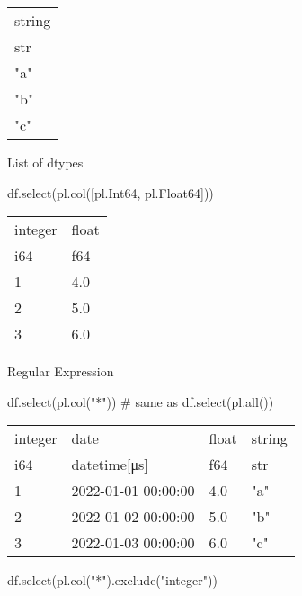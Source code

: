 \documentclass[
  letterpaper,
  DIV=11,
  numbers=noendperiod]{scrartcl}
\newenvironment{Shaded}{\begin{snugshade}}{\end{snugshade}}
\newcommand{\CommentTok}[1]{\textcolor[rgb]{0.37,0.37,0.37}{#1}}
\newcommand{\NormalTok}[1]{\textcolor[rgb]{0.00,0.23,0.31}{#1}}
\newcommand{\StringTok}[1]{\textcolor[rgb]{0.13,0.47,0.30}{#1}}
\begin{document}
\begin{longtable}[]{@{}l@{}}
\toprule()
string \\
str \\
\midrule()
\endhead
"a" \\
"b" \\
"c" \\
\bottomrule()
\end{longtable}

List of dtypes

\begin{Shaded}
\begin{Highlighting}[]
\NormalTok{df.select(pl.col([pl.Int64, pl.Float64]))}
\end{Highlighting}
\end{Shaded}

\begin{longtable}[]{@{}ll@{}}
\toprule()
integer & float \\
i64 & f64 \\
\midrule()
\endhead
1 & 4.0 \\
2 & 5.0 \\
3 & 6.0 \\
\bottomrule()
\end{longtable}

Regular Expression

\begin{Shaded}
\begin{Highlighting}[]
\NormalTok{df.select(pl.col(}\StringTok{"*"}\NormalTok{)) }\CommentTok{\# same as df.select(pl.all())}
\end{Highlighting}
\end{Shaded}

\begin{longtable}[]{@{}llll@{}}
\toprule()
integer & date & float & string \\
i64 & datetime{[}μs{]} & f64 & str \\
\midrule()
\endhead
1 & 2022-01-01 00:00:00 & 4.0 & "a" \\
2 & 2022-01-02 00:00:00 & 5.0 & "b" \\
3 & 2022-01-03 00:00:00 & 6.0 & "c" \\
\bottomrule()
\end{longtable}

\begin{Shaded}
\begin{Highlighting}[]
\NormalTok{df.select(pl.col(}\StringTok{"*"}\NormalTok{).exclude(}\StringTok{"integer"}\NormalTok{))}
\end{Highlighting}
\end{Shaded}
\end{document}

